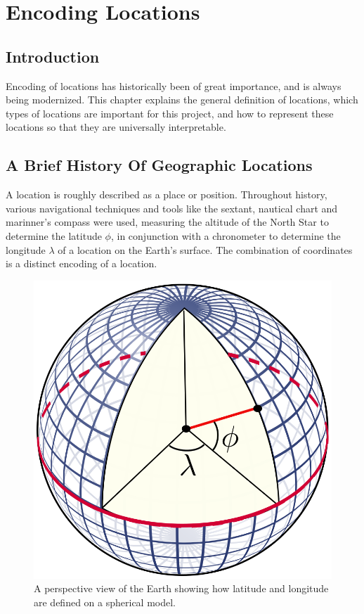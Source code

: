 \graphicspath{{Chapter2/Figs/Vector/}{Chapter2/Figs/}}

%
\chapter{Encoding Locations}
\section{Introduction}
Encoding of locations has historically been of great importance, and is always being modernized. This chapter explains the general definition of locations, which types of locations are important for this project, and how to represent these locations so that they are universally interpretable.

%
\section{A Brief History Of Geographic Locations}
A location is roughly described as a place or position. Throughout history, various navigational techniques and tools like the sextant, nautical chart and marinner's compass were used, measuring the altitude of the North Star to determine the latitude $\phi$, in conjunction with a chronometer to determine the longitude $\lambda$ of a location on the Earth's surface. The combination of coordinates is a distinct encoding of a location.

\begin{figure}[htbp!]
	\centering
	\includegraphics[width=.2\textwidth]{LatLngSphere}
	\caption[LatLngSphere]{A perspective view of the Earth showing how latitude and longitude are defined on a spherical model.}
	\label{fig:latlngsphere}
\end{figure}

